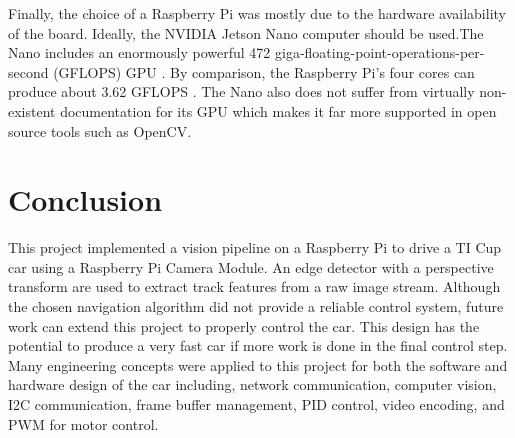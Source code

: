 \documentclass{article}
\begin{document}
Finally, the choice of a Raspberry Pi was mostly due to the hardware availability of the board. Ideally, the NVIDIA Jetson Nano computer should be used.The Nano includes an enormously powerful 472 giga-floating-point-operations-per-second (GFLOPS) GPU \cite{b8}. By comparison, the Raspberry Pi's four cores can produce about 3.62 GFLOPS \cite{b2}. The Nano also does not suffer from virtually non-existent documentation for its GPU which makes it far more supported in open source tools such as OpenCV.

\section{Conclusion}

This project implemented a vision pipeline on a Raspberry Pi to drive a TI Cup car using a Raspberry Pi Camera Module. An edge detector with a perspective transform are used to extract track features from a raw image stream. Although the chosen navigation algorithm did not provide a reliable control system, future work can extend this project to properly control the car. This design has the potential to produce a very fast car if more work is done in the final control step. Many engineering concepts were applied to this project for both the software and hardware design of the car including, network communication, computer vision, I2C communication, frame buffer management, PID control, video encoding, and PWM for motor control.
\end{document}
